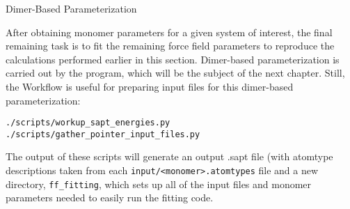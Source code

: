 
\begin{section}{Dimer-Based Parameterization}

After obtaining monomer parameters for a given system of interest, the final
remaining task is to fit the remaining force field parameters to reproduce the
\dftsapt calculations performed earlier in this section. Dimer-based
parameterization is carried out by the \pointer program, which will be the
subject of the next chapter. Still, the Workflow is useful for preparing input
files for this dimer-based parameterization:
%
\begin{lstlisting}
./scripts/workup_sapt_energies.py
./scripts/gather_pointer_input_files.py
\end{lstlisting}
%
The output of these scripts will generate an output .sapt file (with atomtype
descriptions taken from each \verb|input/<monomer>.atomtypes| file and a new
directory, \verb|ff_fitting|, which sets up all of the input files and monomer
parameters needed to easily run the \pointer fitting code.

\end{section}
